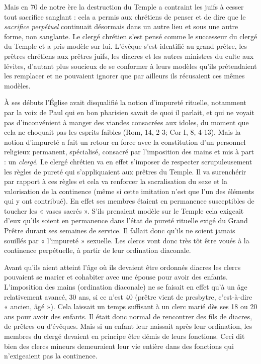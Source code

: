  Mais en 70 de notre ère la destruction du Temple a contraint les juifs à cesser tout sacrifice sanglant : cela a permis aux chrétiens de penser et de dire que le \emph{sacrifice perpétuel} continuait désormais dans un autre lieu et sous une autre forme, non sanglante. Le clergé chrétien s'est pensé comme le successeur du clergé du Temple et a pris modèle sur lui. L'évêque s'est identifié au grand prêtre, les prêtres chrétiens aux prêtres juifs, les diacres et les autres ministres du culte aux lévites, d'autant plus soucieux de se conformer à leurs modèles qu'ils prétendaient les remplacer et ne pouvaient ignorer que par ailleurs ils récusaient ces mêmes modèles.

 À ses débuts l'Église avait disqualifié la notion d'impureté rituelle, notamment par la voix de Paul qui en bon pharisien savait de quoi il parlait, et qui ne voyait pas d'inconvénient à manger des viandes consacrées aux idoles, du moment que cela ne choquait pas les esprits faibles (Rom, 14, 2-3; Cor I, 8, 4-13). Mais la notion d'impureté a fait un retour en force avec la constitution d'un personnel religieux permanent, spécialisé, consacré par l'imposition des mains et mis à part : un \emph{clergé}. Le clergé chrétien va en effet s'imposer de respecter scrupuleusement les règles de pureté qui s'appliquaient aux prêtres du Temple. Il va surenchérir par rapport à ces règles et cela va renforcer la sacralisation du sexe et la valorisation de la continence (même si cette imitation n'est que l'un des éléments qui y ont contribué). En effet ses membres étaient en permanence susceptibles de toucher les « vases sacrés ». S'ils prenaient modèle sur le Temple cela exigeait d'eux qu'ils soient en permanence dans l'état de pureté rituelle exigé du Grand Prêtre durant ses semaines de service. Il fallait donc qu'ils ne soient jamais souillés par « l'impureté » sexuelle. Les clercs vont donc très tôt être voués à la continence perpétuelle, à partir de leur ordination diaconale. 

 Avant qu'ils aient atteint l'âge où ils devaient être ordonnés diacres les clercs pouvaient se marier et cohabiter avec une épouse pour avoir des enfants. L'imposition des mains (ordination diaconale) ne se faisait en effet qu'à un âge relativement avancé, 30 ans, si ce n'est 40 (prêtre vient de presbytre, c'est-à-dire « ancien, âgé »). Cela laissait un temps suffisant à un clerc marié dès ses 18 ou 20 ans pour avoir des enfants. Il était donc normal de rencontrer des fils de diacres, de prêtres ou d'évêques. Mais si un enfant leur naissait après leur ordination, les membres du clergé devaient en principe être démis de leurs fonctions. Ceci dit bien des clercs mineurs demeuraient leur vie entière dans des fonctions qui n'exigeaient pas la continence. 


